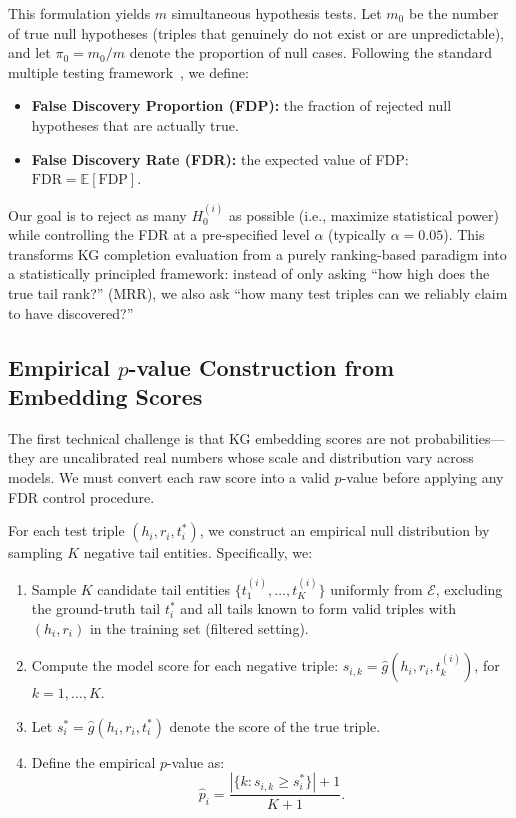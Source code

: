 This formulation yields $m$ simultaneous hypothesis tests. Let $m_0$ be the number of true null hypotheses (triples that genuinely do not exist or are unpredictable), and let $\pi_0 = m_0 / m$ denote the proportion of null cases.
Following the standard multiple testing framework~\cite{benjamini1995controlling, storey2002direct}, we define:
\begin{itemize}
    \item \textbf{False Discovery Proportion (FDP):} the fraction of rejected null hypotheses that are actually true.
    \item \textbf{False Discovery Rate (FDR):} the expected value of FDP: $\text{FDR} = \mathbb{E}[\text{FDP}]$.
\end{itemize}

Our goal is to reject as many $H_0^{(i)}$ as possible (i.e., maximize statistical power) while controlling the FDR at a pre-specified level $\alpha$ (typically $\alpha = 0.05$).
This transforms KG completion evaluation from a purely ranking-based paradigm into a statistically principled framework: instead of only asking ``how high does the true tail rank?'' (MRR), we also ask ``how many test triples can we reliably claim to have discovered?''

\subsection{Empirical $p$-value Construction from Embedding Scores}
\label{subsec:pvalue}

The first technical challenge is that KG embedding scores are not probabilities---they are uncalibrated real numbers whose scale and distribution vary across models.
We must convert each raw score into a valid $p$-value before applying any FDR control procedure.

For each test triple $(h_i, r_i, t^*_i)$, we construct an empirical null distribution by sampling $K$ negative tail entities.
Specifically, we:
\begin{enumerate}
    \item Sample $K$ candidate tail entities $\{t_1^{(i)}, \dots, t_K^{(i)}\}$ uniformly from $\mathcal{E}$, excluding the ground-truth tail $t^*_i$ and all tails known to form valid triples with $(h_i, r_i)$ in the training set (filtered setting).
    \item Compute the model score for each negative triple: $s_{i,k} = \hat{g}(h_i, r_i, t^{(i)}_k)$, for $k = 1, \dots, K$.
    \item Let $s_i^* = \hat{g}(h_i, r_i, t^*_i)$ denote the score of the true triple.
    \item Define the empirical $p$-value as:
    \begin{equation}
        \hat{p}_i = \frac{|\{k : s_{i,k} \geq s_i^*\}| + 1}{K + 1}.
        \label{eq:pvalue}
    \end{equation}
\end{enumerate}

